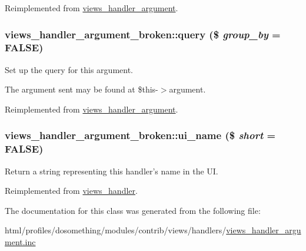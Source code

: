 Reimplemented from \hyperlink{classviews__handler__argument_a44f015a0d527983ae6df2689f66b2c24}{views\_\-handler\_\-argument}.\hypertarget{classviews__handler__argument__broken_a2697e474f3439165001a9a56f82e0e6d}{
\subsubsection[{query}]{\setlength{\rightskip}{0pt plus 5cm}views\_\-handler\_\-argument\_\-broken::query (\$ {\em group\_\-by} = {\ttfamily FALSE})}}
\label{classviews__handler__argument__broken_a2697e474f3439165001a9a56f82e0e6d}
Set up the query for this argument.

The argument sent may be found at \$this-\/$>$argument. 

Reimplemented from \hyperlink{classviews__handler__argument_af9ddabf5d386782c8ffc5785b7ae4263}{views\_\-handler\_\-argument}.\hypertarget{classviews__handler__argument__broken_ac62b831ae47250571ae7449906c1687d}{
\subsubsection[{ui\_\-name}]{\setlength{\rightskip}{0pt plus 5cm}views\_\-handler\_\-argument\_\-broken::ui\_\-name (\$ {\em short} = {\ttfamily FALSE})}}
\label{classviews__handler__argument__broken_ac62b831ae47250571ae7449906c1687d}
Return a string representing this handler's name in the UI. 

Reimplemented from \hyperlink{classviews__handler_ae81019ed08d9c3f5bca3d16c69e7b39f}{views\_\-handler}.

The documentation for this class was generated from the following file:\begin{DoxyCompactItemize}
\item 
html/profiles/dosomething/modules/contrib/views/handlers/\hyperlink{views__handler__argument_8inc}{views\_\-handler\_\-argument.inc}\end{DoxyCompactItemize}
